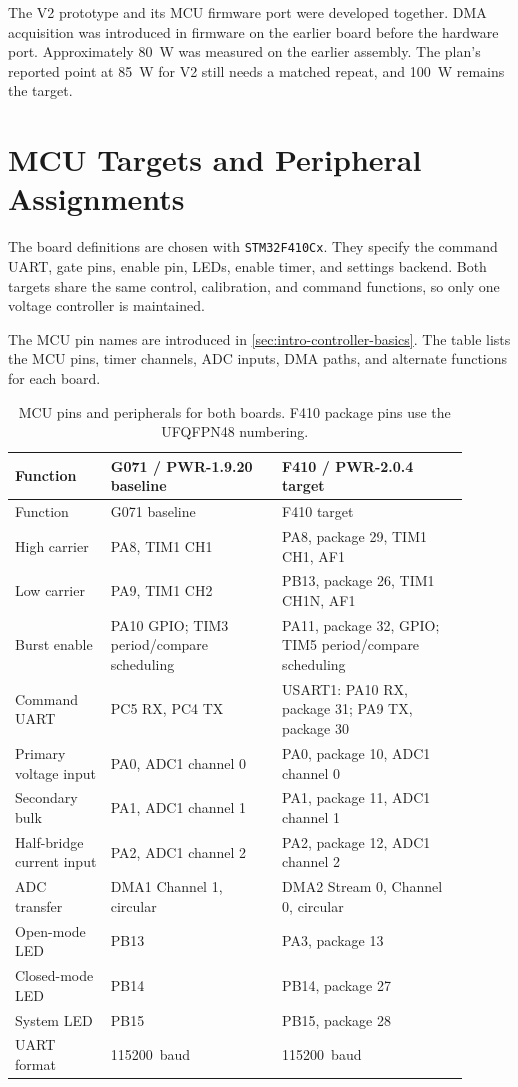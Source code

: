 The V2 prototype and its MCU firmware port were developed together. DMA acquisition was introduced in firmware on the earlier board before the hardware port. Approximately \SI{80}{\watt} was measured on the earlier assembly. The plan's reported point at \SI{85}{\watt} for V2 still needs a matched repeat, and \SI{100}{\watt} remains the target.

\section{MCU Targets and Peripheral Assignments}
\label{sec:app-fw-hardware}

The board definitions are chosen with \texttt{STM32F410Cx}. They specify the command UART, gate pins, enable pin, LEDs, enable timer, and settings backend. Both targets share the same control, calibration, and command functions, so only one voltage controller is maintained.

The MCU pin names are introduced in \cref{sec:intro-controller-basics}.
The table lists the MCU pins, timer channels, ADC inputs, DMA paths, and
alternate functions for each board.

\begin{longtable}{@{}L{0.19\linewidth}L{0.34\linewidth}L{0.37\linewidth}@{}}
\caption{MCU pins and peripherals for both boards. F410 package pins use the UFQFPN48 numbering.}
\label{tab:app-fw-pin-map}\\
\toprule Function & G071 / PWR-1.9.20 baseline & F410 / PWR-2.0.4 target\\\midrule
\endfirsthead
\toprule Function & G071 baseline & F410 target\\\midrule
\endhead
High carrier & PA8, TIM1 CH1 & PA8, package 29, TIM1 CH1, AF1\\
Low carrier & PA9, TIM1 CH2 & PB13, package 26, TIM1 CH1N, AF1\\
Burst enable & PA10 GPIO; TIM3 period/compare scheduling & PA11, package 32, GPIO; TIM5 period/compare scheduling\\
Command UART & PC5 RX, PC4 TX & USART1: PA10 RX, package 31; PA9 TX, package 30\\
Primary voltage input & PA0, ADC1 channel 0 & PA0, package 10, ADC1 channel 0\\
Secondary bulk & PA1, ADC1 channel 1 & PA1, package 11, ADC1 channel 1\\
Half-bridge current input & PA2, ADC1 channel 2 & PA2, package 12, ADC1 channel 2\\
ADC transfer & DMA1 Channel 1, circular & DMA2 Stream 0, Channel 0, circular\\
Open-mode LED & PB13 & PA3, package 13\\
Closed-mode LED & PB14 & PB14, package 27\\
System LED & PB15 & PB15, package 28\\
UART format & \SI{115200}{baud} & \SI{115200}{baud}\\
\bottomrule
\end{longtable}


